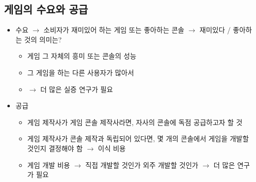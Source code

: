 \subsection{게임의 수요와 공급}
\begin{itemize}
\item 수요 $\rightarrow$ 소비자가 재미있어 하는 게임 또는 좋아하는 콘솔  $\rightarrow$ 재미있다 / 좋아하는 것의 의미는?
	\begin{itemize}
	\item 게임 그 자체의 흥미 또는 콘솔의 성능
	\item 그 게임을 하는 다른 사용자가 많아서
	\item $\rightarrow$ 더 많은 실증 연구가 필요
	\end{itemize}
\item 공급
	\begin{itemize}
	\item 게임 제작사가 게임 콘솔 제작사라면, 자사의 콘솔에 독점 공급하고자 할 것
	\item 게임 제작사가 콘솔 제작과 독립되어 있다면, 몇 개의 콘솔에서 게임을 개발할 것인지 결정해야 함 $\rightarrow$ 이식 비용
	\item 게임 개발 비용 $\rightarrow$ 직접 개발할 것인가 외주 개발할 것인가 $\rightarrow$ 더 많은 연구가 필요
	\end{itemize}
\end{itemize}

